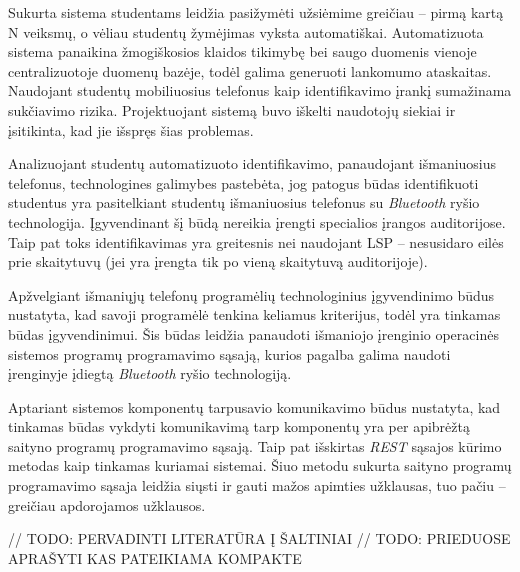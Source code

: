 \documentclass{VUMIFPSbakalaurinis}
\begin{document}
Sukurta sistema studentams leidžia pasižymėti užsiėmime greičiau – pirmą kartą N veiksmų, o vėliau studentų žymėjimas vyksta automatiškai. Automatizuota sistema panaikina žmogiškosios klaidos tikimybę bei saugo duomenis vienoje centralizuotoje duomenų bazėje, todėl galima generuoti lankomumo ataskaitas. Naudojant studentų mobiliuosius telefonus kaip identifikavimo įrankį sumažinama sukčiavimo rizika. Projektuojant sistemą buvo iškelti naudotojų siekiai ir įsitikinta, kad jie išspręs šias problemas.

Analizuojant studentų automatizuoto identifikavimo, panaudojant išmaniuosius telefonus, technologines galimybes pastebėta, jog patogus būdas identifikuoti studentus yra pasitelkiant studentų išmaniuosius telefonus su \textit{Bluetooth} ryšio technologija. Įgyvendinant šį būdą nereikia įrengti specialios įrangos auditorijose. Taip pat toks identifikavimas yra greitesnis nei naudojant LSP – nesusidaro eilės prie skaitytuvų (jei yra įrengta tik po vieną skaitytuvą auditorijoje).

Apžvelgiant išmaniųjų telefonų programėlių technologinius įgyvendinimo būdus nustatyta, kad savoji programėlė tenkina keliamus kriterijus, todėl yra tinkamas būdas įgyvendinimui. Šis būdas leidžia panaudoti išmaniojo įrenginio operacinės sistemos programų programavimo sąsają, kurios pagalba galima naudoti įrenginyje įdiegtą \textit{Bluetooth} ryšio technologiją.

Aptariant sistemos komponentų tarpusavio komunikavimo būdus nustatyta, kad tinkamas būdas vykdyti komunikavimą tarp komponentų yra per apibrėžtą saityno programų programavimo sąsają. Taip pat išskirtas \textit{REST} sąsajos kūrimo metodas kaip tinkamas kuriamai sistemai. Šiuo metodu sukurta saityno programų programavimo sąsaja leidžia siųsti ir gauti mažos apimties užklausas, tuo pačiu – greičiau apdorojamos užklausos.


// TODO: PERVADINTI LITERATŪRA Į ŠALTINIAI
// TODO: PRIEDUOSE APRAŠYTI KAS PATEIKIAMA KOMPAKTE

\printbibliography[heading=bibintoc]  %


\end{document}
